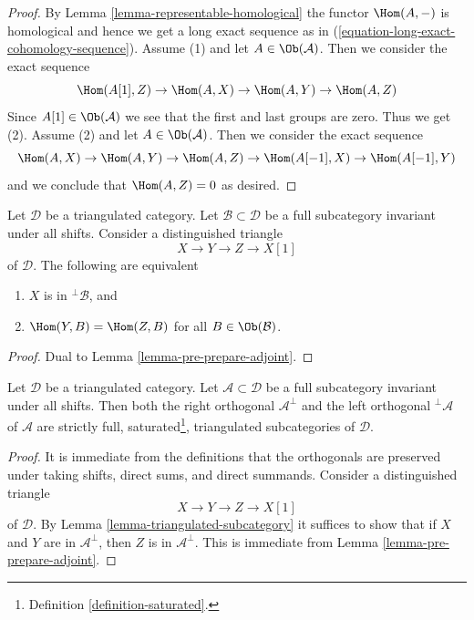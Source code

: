 \begin{proof}
By Lemma \ref{lemma-representable-homological} the functor
$\Hom(A, -)$ is homological and hence we get a long exact sequence
as in (\ref{equation-long-exact-cohomology-sequence}).
Assume (1) and let $A \in \Ob(\mathcal{A})$.
Then we consider the exact sequence
$$
\Hom(A[1], Z) \to \Hom(A, X) \to \Hom(A, Y) \to \Hom(A, Z)
$$
Since $A[1] \in \Ob(\mathcal{A})$
we see that the first and last groups are zero.
Thus we get (2). Assume (2) and let $A \in \Ob(\mathcal{A})$.
Then we consider the exact sequence
$$
\Hom(A, X) \to \Hom(A, Y) \to \Hom(A, Z) \to \Hom(A[-1], X) \to \Hom(A[-1], Y)
$$
and we conclude that $\Hom(A, Z) = 0$ as desired.
\end{proof}

\begin{lemma}
\label{lemma-pre-prepare-adjoint-dual}
Let $\mathcal{D}$ be a triangulated category.
Let $\mathcal{B} \subset \mathcal{D}$
be a full subcategory invariant under all shifts.
Consider a distinguished triangle
$$
X \to Y \to Z \to X[1]
$$
of $\mathcal{D}$. The following are equivalent
\begin{enumerate}
\item $X$ is in ${}^\perp\mathcal{B}$, and
\item $\Hom(Y, B) = \Hom(Z, B)$ for all $B \in \Ob(\mathcal{B})$.
\end{enumerate}
\end{lemma}

\begin{proof}
Dual to Lemma \ref{lemma-pre-prepare-adjoint}.
\end{proof}

\begin{lemma}
\label{lemma-orthogonal-triangulated}
Let $\mathcal{D}$ be a triangulated category. Let
$\mathcal{A} \subset \mathcal{D}$ be a full subcategory invariant
under all shifts. Then both the right orthogonal $\mathcal{A}^\perp$ and
the left orthogonal ${}^\perp\mathcal{A}$ of $\mathcal{A}$
are strictly full, saturated\footnote{Definition \ref{definition-saturated}.},
triangulated subcategories of $\mathcal{D}$.
\end{lemma}

\begin{proof}
It is immediate from the definitions that the orthogonals are preserved
under taking shifts, direct sums, and direct summands.
Consider a distinguished triangle
$$
X \to Y \to Z \to X[1]
$$
of $\mathcal{D}$. By Lemma \ref{lemma-triangulated-subcategory} it
suffices to show that if $X$ and $Y$ are in $\mathcal{A}^\perp$, then
$Z$ is in $\mathcal{A}^\perp$. This is immediate from
Lemma \ref{lemma-pre-prepare-adjoint}.
\end{proof}

